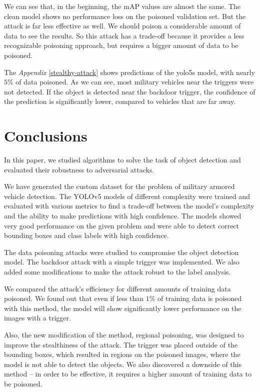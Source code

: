 \documentclass[14pt,a4paper]{extarticle}
\newcounter{e}
\numberwithin{equation}{section}
\numberwithin{figure}{section}
\begin{document}
We can see that, in the beginning, the mAP values are almost the same. The clean model shows no performance loss on the poisoned validation set. But the attack is far less effective as well. We should poison a considerable amount of data to see the results. So this attack has a trade-off because it provides a less recognizable poisoning approach, but requires a bigger amount of data to be poisoned.

The \textit{Appendix} \ref{stealthy-attack} shows predictions of the yolo5s model, with nearly $5\%$ of data poisoned. As we can see, most military vehicles near the triggers were not detected. If the object is detected near the backdoor trigger, the confidence of the prediction is significantly lower, compared to vehicles that are far away.

\newpage
\thispagestyle{empty}
\section{Conclusions}

In this paper, we studied algorithms to solve the task of object detection and evaluated their robustness to adversarial attacks.

We have generated the custom dataset for the problem of military armored vehicle detection. The YOLOv5 models of different complexity were trained and evaluated with various metrics to find a trade-off between the model's complexity and the ability to make predictions with high confidence. The models showed very good performance on the given problem and were able to detect correct bounding boxes and class labels with high confidence.

The data poisoning attacks were studied to compromise the object detection model. The backdoor attack with a simple trigger was implemented. We also added some modifications to make the attack robust to the label analysis.

We compared the attack's efficiency for different amounts of training data poisoned. We found out that even if less than $1\%$ of training data is poisoned with this method, the model will show significantly lower performance on the images with a trigger.

Also, the new modification of the method, regional poisoning, was designed to improve the stealthiness of the attack. The trigger was placed outside of the bounding boxes, which resulted in regions on the poisoned images, where the model is not able to detect the objects. We also discovered a downside of this method -- in order to be effective, it requires a higher amount of training data to be poisoned.
\end{document}
